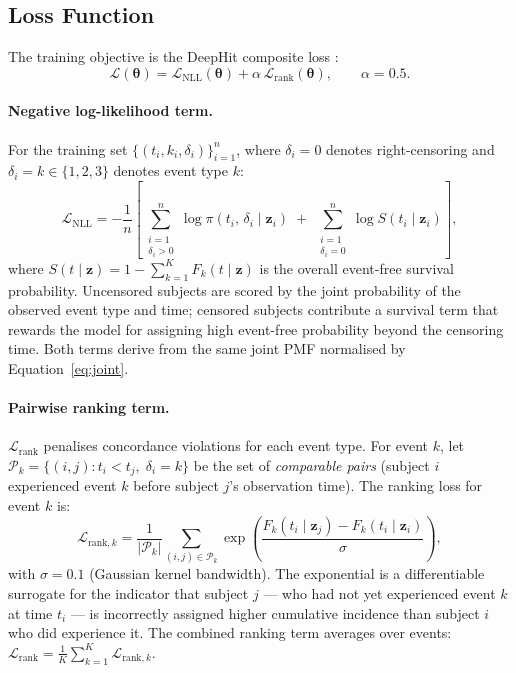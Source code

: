 \documentclass[11pt,a4paper]{article}
\begin{document}
\subsection{Loss Function}
\label{sec:loss}

The training objective is the DeepHit composite loss \citep{lee2018deephit}:
\begin{equation}
  \mathcal{L}(\boldsymbol{\theta})
    = \mathcal{L}_{\mathrm{NLL}}(\boldsymbol{\theta})
    + \alpha\,\mathcal{L}_{\mathrm{rank}}(\boldsymbol{\theta}),
  \qquad \alpha = 0.5.
  \label{eq:loss}
\end{equation}

\paragraph{Negative log-likelihood term.}
For the training set $\{(t_i, k_i, \delta_i)\}_{i=1}^n$, where $\delta_i = 0$
denotes right-censoring and $\delta_i = k \in \{1,2,3\}$ denotes event type $k$:
\begin{equation}
  \mathcal{L}_{\mathrm{NLL}}
    = -\frac{1}{n}\!\left[
      \sum_{\substack{i=1 \\ \delta_i > 0}}^{n}
      \log \pi(t_i,\, \delta_i \mid \mathbf{z}_i)
      \;+\;
      \sum_{\substack{i=1 \\ \delta_i = 0}}^{n}
      \log S(t_i \mid \mathbf{z}_i)
    \right],
  \label{eq:nll}
\end{equation}
where $S(t \mid \mathbf{z}) = 1 - \sum_{k=1}^{K} F_k(t \mid \mathbf{z})$ is the
overall event-free survival probability.  Uncensored subjects are scored by the
joint probability of the observed event type and time; censored subjects
contribute a survival term that rewards the model for assigning high event-free
probability beyond the censoring time.  Both terms derive from the same
joint PMF normalised by Equation~\eqref{eq:joint}.

\paragraph{Pairwise ranking term.}
$\mathcal{L}_{\mathrm{rank}}$ penalises concordance violations for each event
type.  For event $k$, let $\mathcal{P}_k = \{(i,j) : t_i < t_j,\;
\delta_i = k\}$ be the set of \emph{comparable pairs} (subject $i$ experienced
event $k$ before subject $j$'s observation time).  The ranking loss for event
$k$ is:
\begin{equation}
  \mathcal{L}_{\mathrm{rank},k}
    = \frac{1}{|\mathcal{P}_k|}
      \sum_{(i,j)\in\mathcal{P}_k}
      \exp\!\left(\frac{F_k(t_i \mid \mathbf{z}_j)
                       - F_k(t_i \mid \mathbf{z}_i)}{\sigma}\right),
  \label{eq:rank}
\end{equation}
with $\sigma = 0.1$ (Gaussian kernel bandwidth).  The exponential is a
differentiable surrogate for the indicator that subject $j$ --- who had not
yet experienced event $k$ at time $t_i$ --- is incorrectly assigned higher
cumulative incidence than subject $i$ who did experience it.  The combined
ranking term averages over events:
$\mathcal{L}_{\mathrm{rank}} = \frac{1}{K}\sum_{k=1}^K
\mathcal{L}_{\mathrm{rank},k}$.
\end{document}
